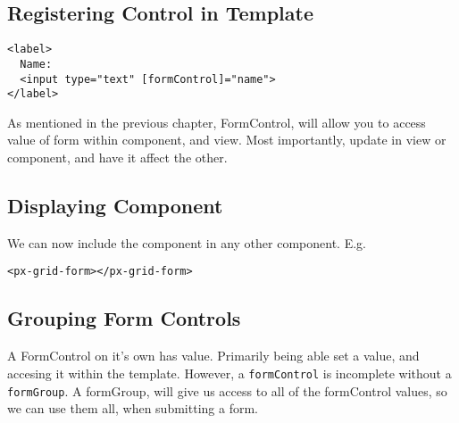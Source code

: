 \subsection{Registering Control in Template}
\begin{lstlisting}
<label>
  Name:
  <input type="text" [formControl]="name">
</label>
\end{lstlisting}

As mentioned in the previous chapter, FormControl, will allow you to access 
value of form within component, and view. Most importantly, update in view 
or component, and have it affect the other. 

\subsection{ Displaying Component }
We can now include the component in any other component. E.g. 
\begin{lstlisting}[caption=app.component.html]
<px-grid-form></px-grid-form>  
\end{lstlisting}

\subsection{ Grouping Form Controls }
A FormControl on it's own has value. Primarily being able set a value, and
accesing it within the template. However, a \lstinline{formControl} is 
incomplete without a \lstinline{formGroup}. A formGroup, will give us 
access to all of the formControl values, so we can use them all, when 
submitting a form. 


